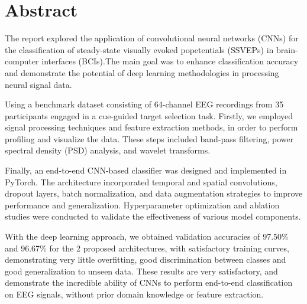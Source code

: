 \section{Abstract}

The report explored the application of convolutional neural networks (CNNs) for the classification of steady-state visually evoked popetentials (SSVEPs) in brain-computer interfaces (BCIs).The main goal was to enhance classification accuracy and demonstrate the potential of deep learning methodologies in processing neural signal data.

Using a benchmark dataset consisting of 64-channel EEG recordings from 35 participants engaged in a cue-guided target selection task. Firstly, we employed signal processing techniques and feature extraction methods, in order to perform profiling and visualize the data. These steps included band-pass filtering, power spectral density (PSD) analysis, and wavelet transforms.

Finally, an end-to-end CNN-based classifier was designed and implemented in PyTorch. The architecture incorporated temporal and spatial convolutions, dropout layers, batch normalization, and data augmentation strategies to improve performance and generalization. Hyperparameter optimization and ablation studies were conducted to validate the effectiveness of various model components.

With the deep learning approach, we obtained validation accuracies of 97.50\% and 96.67\% for the 2 proposed architectures, with satisfactory training curves, demonstrating very little overfitting, good discrimination between classes and good generalization to unseen data. These results are very satisfactory, and demonstrate the incredible ability of CNNs to perform end-to-end classification on EEG signals, without prior domain knowledge or feature extraction.
